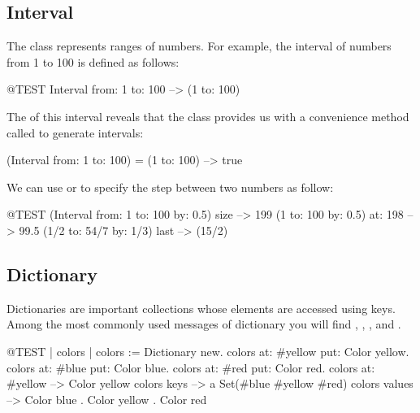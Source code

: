\documentclass[a4paper,10pt,twoside]{book}
\begin{document}

\subsection{Interval}
The class  represents ranges of numbers. For example, the interval of numbers from 1 to 100 is defined as follows:
\begin{code}{@TEST}
Interval from: 1 to: 100 --> (1 to: 100)
\end{code}

\noindent
The  of this interval reveals that the class  provides us with a convenience method called  to generate intervals:

\begin{code}{}
(Interval from: 1 to: 100) = (1 to: 100) --> true
\end{code}

We can use  or  to specify the step between two numbers as follow:

\begin{code}{@TEST}
(Interval from: 1 to: 100 by: 0.5) size --> 199
(1 to: 100 by: 0.5) at: 198 --> 99.5
(1/2 to: 54/7 by: 1/3) last --> (15/2)
\end{code}

\subsection{Dictionary}
Dictionaries are important collections whose elements are accessed using keys. 
Among the most commonly used messages of dictionary you will find , , ,  and .

\begin{code}{@TEST | colors |}
colors := Dictionary new.
colors at: #yellow put: Color yellow.
colors at: #blue put: Color blue.
colors at: #red put: Color red.
colors at: #yellow --> Color yellow
colors keys          --> a Set(#blue #yellow #red)
colors values       --> {Color blue . Color yellow . Color red}
\end{code}
\end{document}
